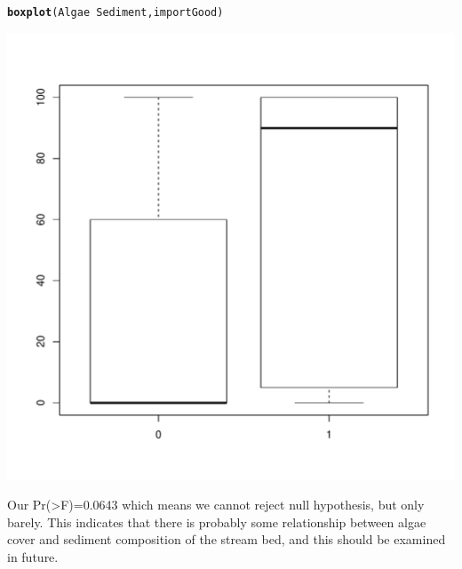 \documentclass{article}\usepackage[]{graphicx}\usepackage[]{color}
\makeatletter
\def\maxwidth{ %
  \ifdim\Gin@nat@width>\linewidth
    \linewidth
  \else
    \Gin@nat@width
  \fi
}
\newcommand{\hlopt}[1]{\textcolor[rgb]{0,0,0}{#1}}%
\newcommand{\hlstd}[1]{\textcolor[rgb]{0.345,0.345,0.345}{#1}}%
\newcommand{\hlkwd}[1]{\textcolor[rgb]{0.737,0.353,0.396}{\textbf{#1}}}%
\newenvironment{kframe}{%
 \def\at@end@of@kframe{}%
 \ifinner\ifhmode%
  \def\at@end@of@kframe{\end{minipage}}%
  \begin{minipage}{\columnwidth}%
 \fi\fi%
 \def\FrameCommand##1{\hskip\@totalleftmargin \hskip-\fboxsep
 \colorbox{shadecolor}{##1}\hskip-\fboxsep
     \hskip-\linewidth \hskip-\@totalleftmargin \hskip\columnwidth}%
 \MakeFramed {\advance\hsize-\width
   \@totalleftmargin\z@ \linewidth\hsize
   \@setminipage}}%
 {\par\unskip\endMakeFramed%
 \at@end@of@kframe}
\newenvironment{knitrout}{}{} %
\makeatother
\begin{document}
\begin{knitrout}
\color{fgcolor}\begin{kframe}
\begin{alltt}
\hlkwd{boxplot}\hlstd{(Algae}\hlopt{~}\hlstd{Sediment,importGood)}
\end{alltt}
\end{kframe}
\includegraphics[width=\maxwidth]{figure/unnamed-chunk-10-1} 

\end{knitrout}
Our Pr(>F)=0.0643 which means we cannot reject null hypothesis, but only barely. This indicates that there is probably some relationship between algae cover and sediment composition of the stream bed, and this should be examined in future. 
\end{document}
